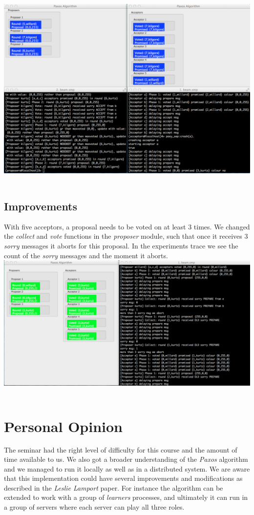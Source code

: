 \documentclass[a4paper, 11pt]{article}
\begin{document}
\includegraphics[scale=0.35]{images/exp11.png} \\\\

\subsection{Improvements}

With five acceptors, a proposal needs to be voted on at least 3 times. We changed the \textit{collect} and \textit{vote} functions in the \textit{proposer} module, such that once it receives 3 \textit{sorry} messages it aborts for this proposal. In the experiments trace we see the count of the \textit{sorry} messages and the moment it aborts.\\

\includegraphics[scale=0.35]{images/exp12.png} \\\\

\section{Personal Opinion}

The seminar had the right level of difficulty for this course and the amount of time available to us. We also got a broader understanding of the \textit{Paxos} algorithm and we managed to run it locally as well as in a distributed system. We are aware that this implementation could have several improvements and modifications as described in the \textit{Leslie Lamport} paper. For instance the algorithm can be extended to work with a group of \textit{learners} processes, and ultimately it can run in a group of servers where each server can play all three roles.
\end{document}
